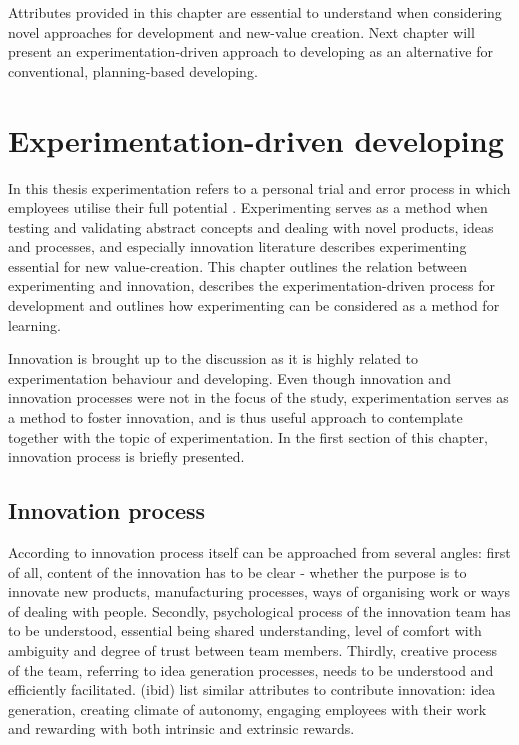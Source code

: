 Attributes provided in this chapter are essential to understand when considering novel approaches for development and new-value creation. Next chapter will present an experimentation-driven approach to developing as an alternative for conventional, planning-based developing. 
 
\chapter{Experimentation-driven developing}
In this thesis experimentation refers to a personal trial and error process in which employees utilise their full potential \citep{andriopoulos2000enhancing}. Experimenting serves as a method when testing and validating abstract concepts \citep{kolb1984experiential} and dealing with novel products, ideas and processes, and especially innovation literature describes experimenting essential for new value-creation. This chapter outlines the relation between experimenting and innovation, describes the experimentation-driven process for development and outlines how experimenting can be considered as a method for learning. 

Innovation is brought up to the discussion as it is highly related to experimentation behaviour and developing. Even though innovation and innovation processes were not in the focus of the study, experimentation serves as a method to foster innovation, and is thus useful approach to contemplate together with the topic of experimentation. In the first section of this chapter, innovation process is briefly presented. 

\section{Innovation process}
According to \citet{bujis2007innovation} innovation process itself can be approached from several angles: first of all, content of the innovation has to be clear - whether the purpose is to innovate new products, manufacturing processes, ways of organising work or ways of dealing with people. Secondly, psychological process of the innovation team has to be understood, essential being shared understanding, level of comfort with ambiguity and degree of trust between team members. Thirdly, creative process of the team, referring to idea generation processes, needs to be understood and efficiently facilitated. (ibid) \citet{amabile1996assessing} list similar attributes to contribute innovation: idea generation, creating climate of autonomy, engaging employees with their work and rewarding with both intrinsic and extrinsic rewards. 

